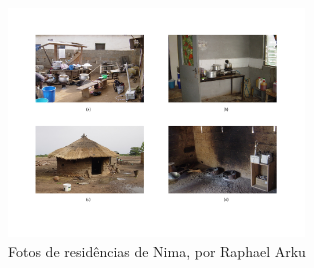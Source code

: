 \begin{figure}[H]
  \centering
    \includegraphics[width=0.7\textwidth]{../inputs/images/zheng/nima.pdf}
    \caption{Fotos de residências de Nima, por Raphael Arku \label{fig:nima}}
\end{figure}
